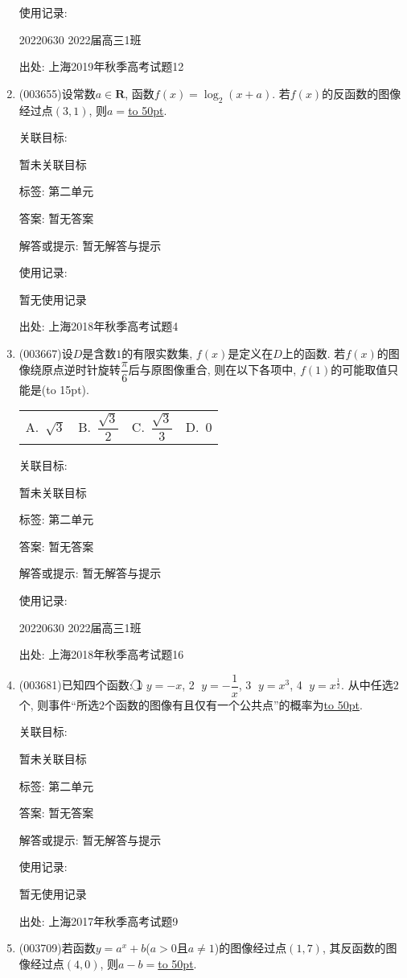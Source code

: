 \documentclass[10pt,a4paper]{article}
\newcommand{\blank}[1]{\underline{\hbox to #1pt{}}}
\newcommand{\bracket}[1]{(\hbox to #1pt{})}
\newcommand{\fourch}[4]{\par\begin{tabular}{p{.23\textwidth}p{.23\textwidth}p{.23\textwidth}p{.23\textwidth}}
A.~#1 &B.~#2& C.~#3& D.~#4
\end{tabular}}
\begin{document}
\begin{enumerate}[1.]
使用记录:

20220630	2022届高三1班	


出处: 上海2019年秋季高考试题12
\item { (003655)}设常数$a\in \mathbf{R}$, 函数$f(x)=\log_2(x+a)$. 若$f(x)$的反函数的图像经过点$(3,1)$, 则$a=$\blank{50}.


关联目标:

暂未关联目标



标签: 第二单元

答案: 暂无答案

解答或提示: 暂无解答与提示

使用记录:

暂无使用记录


出处: 上海2018年秋季高考试题4
\item { (003667)}设$D$是含数$1$的有限实数集, $f(x)$是定义在$D$上的函数. 若$f(x)$的图像绕原点逆时针旋转$\dfrac{\pi}{6}$后与原图像重合, 则在以下各项中, $f(1)$的可能取值只能是\bracket{15}.
\fourch{$\sqrt{3}$}{$\dfrac{\sqrt{3}}{2}$}{$\dfrac{\sqrt{3}}{3}$}{$0$}


关联目标:

暂未关联目标



标签: 第二单元

答案: 暂无答案

解答或提示: 暂无解答与提示

使用记录:

20220630	2022届高三1班	


出处: 上海2018年秋季高考试题16
\item { (003681)}已知四个函数: \textcircled{1} $y=-x$, \textcircled{2} $y=-\dfrac{1}{x}$, \textcircled{3} $y=x^3$, \textcircled{4} $y=x^{\frac{1}{2}}$. 从中任选$2$个, 则事件``所选$2$个函数的图像有且仅有一个公共点''的概率为\blank{50}.


关联目标:

暂未关联目标



标签: 第二单元

答案: 暂无答案

解答或提示: 暂无解答与提示

使用记录:

暂无使用记录


出处: 上海2017年秋季高考试题9
\item { (003709)}若函数$y=a^x+b$($a>0$且$a\ne 1$)的图像经过点$(1,7)$, 其反函数的图像经过点$(4,0)$, 则$a-b=$\blank{50}.



\end{enumerate}
\end{document}
